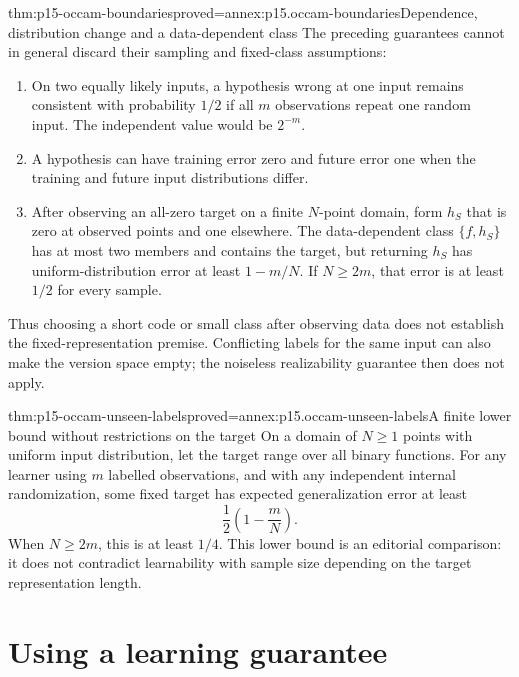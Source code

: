 \begin{hbtheorem}{thm:p15-occam-boundaries}{proved=annex:p15.occam-boundaries}{Dependence, distribution change and a data-dependent class}
The preceding guarantees cannot in general discard their sampling
and fixed-class assumptions:
\begin{enumerate}
\item On two equally likely inputs, a hypothesis wrong at one
      input remains consistent with probability \(1/2\) if all
      \(m\) observations repeat one random input. The independent
      value would be \(2^{-m}\).
\item A hypothesis can have training error zero and future error
      one when the training and future input distributions differ.
\item After observing an all-zero target on a finite \(N\)-point
      domain, form \(h_S\) that is zero at observed points and
      one elsewhere. The data-dependent class \(\{f,h_S\}\)
      has at most two members and contains the target, but
      returning \(h_S\) has uniform-distribution error at least
      \(1-m/N\). If \(N\geq2m\), that error is at least \(1/2\)
      for every sample.
\end{enumerate}
Thus choosing a short code or small class after observing data
does not establish the fixed-representation premise. Conflicting
labels for the same input can also make the version space empty;
the noiseless realizability guarantee then does not apply.
\end{hbtheorem}

\begin{hbtheorem}{thm:p15-occam-unseen-labels}{proved=annex:p15.occam-unseen-labels}{A finite lower bound without restrictions on the target}
On a domain of \(N\geq1\) points with uniform input distribution,
let the target range over all binary functions. For any learner
using \(m\) labelled observations, and with any independent internal
randomization, some fixed target has expected generalization error
at least
\[
                           \frac12\left(1-\frac mN\right).
\]
When \(N\geq2m\), this is at least \(1/4\).
This lower bound is an editorial comparison: it does not
contradict learnability with sample size depending on the
target representation length.
\end{hbtheorem}

\section{Using a learning guarantee}

